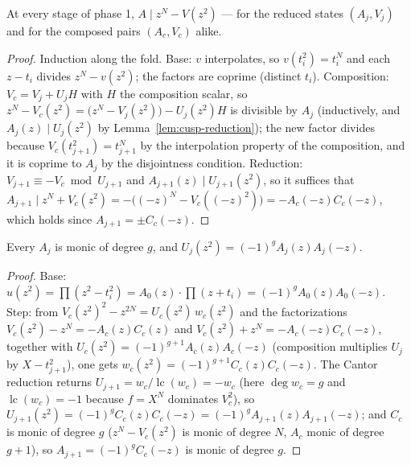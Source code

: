 \begin{lemma}
\label{lem:cusp-divisibility}
\leanok
At every stage of phase 1, $A \mid z^N - V(z^2)$ --- for the reduced states
$(A_j, V_j)$ and for the composed pairs $(A_c, V_c)$ alike.
\end{lemma}
\begin{proof}
\leanok
Induction along the fold. Base: $v$ interpolates, so $v(t_i^2) = t_i^N$ and each
$z - t_i$ divides $z^N - v(z^2)$; the factors are coprime (distinct $t_i$). Composition:
$V_c = V_j + U_j H$ with $H$ the composition scalar, so
$z^N - V_c(z^2) = \bigl(z^N - V_j(z^2)\bigr) - U_j(z^2)H$ is divisible by $A_j$
(inductively, and $A_j(z) \mid U_j(z^2)$ by Lemma~\ref{lem:cusp-reduction}); the new
factor divides because $V_c(t_{j+1}^2) = t_{j+1}^N$ by the interpolation property of the
composition, and it is coprime to $A_j$ by the disjointness condition. Reduction:
$V_{j+1} \equiv -V_c \bmod U_{j+1}$ and $A_{j+1}(z) \mid U_{j+1}(z^2)$, so it suffices
that $A_{j+1} \mid z^N + V_c(z^2) = -\bigl((-z)^N - V_c((-z)^2)\bigr) =
-A_c(-z)C_c(-z)$, which holds since $A_{j+1} = \pm C_c(-z)$.
\end{proof}

\begin{lemma}
\label{lem:cusp-reduction}
\leanok
Every $A_j$ is monic of degree $g$, and $U_j(z^2) = (-1)^g A_j(z) A_j(-z)$.
\end{lemma}
\begin{proof}
\leanok
Base: $u(z^2) = \prod(z^2 - t_i^2) = A_0(z) \cdot \prod(z + t_i) =
(-1)^g A_0(z) A_0(-z)$. Step: from $V_c(z^2)^2 - z^{2N} = U_c(z^2)\, w_c(z^2)$ and the
factorizations $V_c(z^2) - z^N = -A_c(z)C_c(z)$ and $V_c(z^2) + z^N = -A_c(-z)C_c(-z)$,
together with $U_c(z^2) = (-1)^{g+1} A_c(z) A_c(-z)$ (composition multiplies $U_j$ by
$X - t_{j+1}^2$), one gets $w_c(z^2) = (-1)^{g+1} C_c(z) C_c(-z)$. The Cantor reduction
returns $U_{j+1} = w_c/\operatorname{lc}(w_c) = -w_c$ (here $\deg w_c = g$ and
$\operatorname{lc}(w_c) = -1$ because $f = X^N$ dominates $V_c^2$), so
$U_{j+1}(z^2) = (-1)^g C_c(z)C_c(-z) = (-1)^g A_{j+1}(z) A_{j+1}(-z)$; and $C_c$ is
monic of degree $g$ ($z^N - V_c(z^2)$ is monic of degree $N$, $A_c$ monic of degree
$g+1$), so $A_{j+1} = (-1)^g C_c(-z)$ is monic of degree $g$.
\end{proof}

